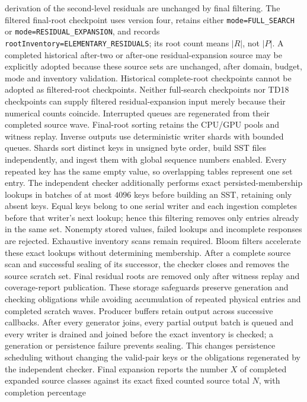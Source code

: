 \documentclass[11pt,a4paper]{article}
\begin{document}
derivation of the second-level residuals are unchanged by final filtering.
The filtered final-root checkpoint uses version four, retains either
\nolinkurl{mode=FULL_SEARCH} or \nolinkurl{mode=RESIDUAL_EXPANSION}, and records
\nolinkurl{rootInventory=ELEMENTARY_RESIDUALS}; its root count means $|R|$,
not $|P|$. A completed historical after-two or after-one
residual-expansion source may be explicitly adopted because these source sets
are unchanged, after domain, budget, mode and inventory validation. Historical
complete-root checkpoints cannot be adopted as filtered-root checkpoints.
Neither full-search checkpoints nor TD18 checkpoints can supply filtered
residual-expansion input merely because their numerical counts coincide.
Interrupted queues are regenerated from their completed
source wave. Final-root sorting retains the CPU/GPU pools and witness replay.
Inverse outputs use deterministic writer shards with bounded queues. Shards
sort distinct keys in unsigned byte order, build SST files independently,
and ingest them with global sequence numbers enabled. Every repeated key
has the same empty value, so overlapping tables represent one set entry.
The independent checker additionally performs exact persisted-membership
lookups in batches of at most $4096$ keys before building an SST, retaining
only absent keys. Equal keys belong to one serial writer and each ingestion
completes before that writer's next lookup; hence this filtering removes only
entries already in the same set. Nonempty stored values, failed lookups and
incomplete responses are rejected. Exhaustive inventory scans remain required.
Bloom filters accelerate these exact lookups without determining membership.
After a complete source scan and successful sealing of its successor, the
checker closes and removes the source scratch set. Final residual roots are
removed only after witness replay and coverage-report publication. These
storage safeguards preserve generation and checking obligations while avoiding
accumulation of repeated physical entries and completed scratch waves.
Producer buffers retain output across successive callbacks. After every
generator joins, every partial output batch is queued and every writer is
drained and joined before
the exact inventory is checked; a generation or persistence failure prevents
sealing. This changes persistence scheduling without changing the valid-pair
keys or the obligations regenerated by the independent checker.
Final expansion reports the number $X$ of completed expanded source classes
against its exact fixed counted source total $N$, with completion percentage
\end{document}
